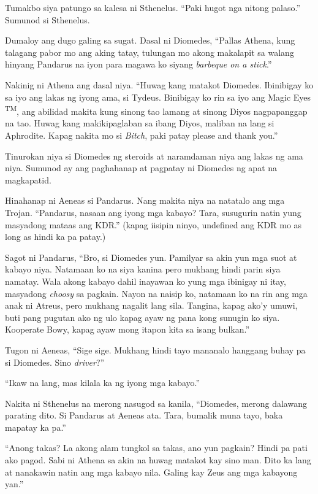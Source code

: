 \documentclass[12pt,letterpaper]{report}
\begin{document}
Tumakbo siya patungo sa kalesa ni Sthenelus. ``Paki hugot nga nitong palaso.'' Sumunod si Sthenelus.

Dumaloy ang dugo galing sa sugat. Dasal ni Diomedes, ``Pallas Athena, kung talagang pabor mo ang aking tatay, tulungan mo akong makalapit sa walang hinyang Pandarus na iyon para magawa ko siyang \textit{barbeque on a stick}.''

Nakinig ni Athena ang dasal niya. ``Huwag kang matakot Diomedes. Ibinibigay ko sa iyo ang lakas ng iyong ama, si Tydeus. Binibigay ko rin sa iyo ang Magic Eyes \textsuperscript{TM}, ang abilidad makita kung sinong tao lamang at sinong Diyos nagpapanggap na tao. Huwag kang makikipaglaban sa ibang Diyos, maliban na lang si Aphrodite. Kapag nakita mo si \textit{Bitch}, paki patay please and thank you.''

Tinurokan niya si Diomedes ng steroids at naramdaman niya ang lakas ng ama niya. Sumunod ay ang paghahanap at pagpatay ni Diomedes ng apat na magkapatid.

Hinahanap ni Aeneas si Pandarus. Nang makita niya na natatalo ang mga Trojan. ``Pandarus, nasaan ang iyong mga kabayo? Tara, susugurin natin yung masyadong mataas ang KDR.'' (kapag iisipin ninyo, undefined ang KDR mo as long as hindi ka pa patay.)

Sagot ni Pandarus, ``Bro, si Diomedes yun. Pamilyar sa akin yun mga suot at kabayo niya. Natamaan ko na siya kanina pero mukhang hindi parin siya namatay. Wala akong kabayo dahil inayawan ko yung mga ibinigay ni itay, masyadong \textit{choosy} sa pagkain. Nayon na naisip ko, natamaan ko na rin ang mga anak ni Atreus, pero mukhang nagalit lang sila. Tangina, kapag ako'y umuwi, buti pang pugutan ako ng ulo kapag ayaw ng pana kong sunugin ko siya. Kooperate Bowy, kapag ayaw mong itapon kita sa isang bulkan.''

Tugon ni Aeneas, ``Sige sige. Mukhang hindi tayo mananalo hanggang buhay pa si Diomedes. Sino \textit{driver}?''

``Ikaw na lang, mas kilala ka ng iyong mga kabayo.''

Nakita ni Sthenelus na merong nasugod sa kanila, ``Diomedes, merong dalawang parating dito. Si Pandarus at Aeneas ata. Tara, bumalik muna tayo, baka mapatay ka pa.''

``Anong takas? La akong alam tungkol sa takas, ano yun pagkain? Hindi pa pati ako pagod. Sabi ni Athena sa akin na huwag matakot kay sino man. Dito ka lang at nanakawin natin ang mga kabayo nila. Galing kay Zeus ang mga kabayong yan.''
\end{document}
